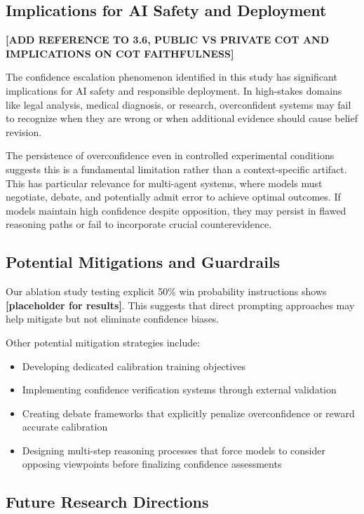 \documentclass{article}
\begin{document}
\subsection{Implications for AI Safety and Deployment}

\textbf{[ADD REFERENCE TO 3.6, PUBLIC VS PRIVATE COT AND IMPLICATIONS ON COT FAITHFULNESS]}

The confidence escalation phenomenon identified in this study has significant implications for AI safety and responsible deployment. In high-stakes domains like legal analysis, medical diagnosis, or research, overconfident systems may fail to recognize when they are wrong or when additional evidence should cause belief revision.

The persistence of overconfidence even in controlled experimental conditions suggests this is a fundamental limitation rather than a context-specific artifact. This has particular relevance for multi-agent systems, where models must negotiate, debate, and potentially admit error to achieve optimal outcomes. If models maintain high confidence despite opposition, they may persist in flawed reasoning paths or fail to incorporate crucial counterevidence.

\subsection{Potential Mitigations and Guardrails}

Our ablation study testing explicit 50\% win probability instructions shows \textbf{[placeholder for results]}. This suggests that direct prompting approaches may help mitigate but not eliminate confidence biases.

Other potential mitigation strategies include:
\begin{itemize}
    \item Developing dedicated calibration training objectives
    \item Implementing confidence verification systems through external validation
    \item Creating debate frameworks that explicitly penalize overconfidence or reward accurate calibration
    \item Designing multi-step reasoning processes that force models to consider opposing viewpoints before finalizing confidence assessments
\end{itemize}

\subsection{Future Research Directions}
\end{document}
